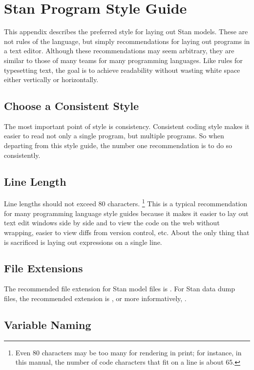 \chapter{Stan Program Style Guide}

\noindent
This appendix describes the preferred style for laying out Stan
models. These are not rules of the language, but simply
recommendations for laying out programs in a text editor.  Although
these recommendations may seem arbitrary, they are similar to those of
many teams for many programming languages.  Like rules for typesetting
text, the goal is to achieve readability without wasting white space
either vertically or horizontally.

\section{Choose a Consistent Style}

The most important point of style is consistency.  Consistent coding
style makes it easier to read not only a single program, but multiple
programs.  So when departing from this style guide, the number one
recommendation is to do so consistently.

\section{Line Length}

Line lengths should not exceed 80 characters.%
%
\footnote{Even 80 characters may be too many for rendering in print;
  for instance, in this manual, the number of code characters that fit
  on a line is about 65.}
%
This is a typical recommendation for many programming language style
guides because it makes it easier to lay out text edit windows side by
side and to view the code on the web without wrapping, easier to view
diffs from version control, etc.  About the only thing that is
sacrificed is laying out expressions on a single line.

\section{File Extensions}

The recommended file extension for Stan model files is .  
For Stan data dump files, the recommended extension is , or
more informatively, .

\section{Variable Naming}

